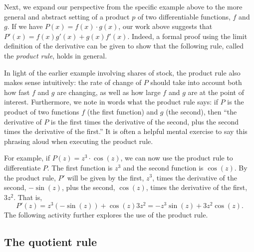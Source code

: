 Next, we expand our perspective from the specific example above to the more general and abstract setting of a product $p$ of two differentiable functions, $f$ and $g$.  If we have $P(x) = f(x) \cdot g(x)$, our work above suggests that $P'(x) = f(x) g'(x) + g(x) f'(x).$ Indeed, a formal proof using the limit definition of the derivative can be given to show that the following rule, called the \emph{product rule}, holds in general.

\vspace*{5pt}
\nin {}
\vspace*{1pt}

In light of the earlier example involving shares of stock, the product rule also makes sense intuitively:  the rate of change of $P$ should take into account both how fast $f$ and $g$ are changing, as well as how large $f$ and $g$ are at the point of interest.  Furthermore, we note in words what the product rule says:  if $P$ is the product of two functions $f$ (the first function) and $g$ (the second), then ``the derivative of $P$ is the first times the derivative of the second, plus the second times the derivative of the first.''  It is often a helpful mental exercise to say this phrasing aloud when executing the product rule.

For example, if $P(z) = z^3 \cdot \cos(z)$, we can now use the product rule to differentiate $P$.  The first function is $z^3$ and the second function is $\cos(z)$.  By the product rule, $P'$ will be given by the first, $z^3$, times the derivative of the second, $-\sin(z)$, plus the second, $\cos(z)$, times the derivative of the first,  $3z^2$.  That is,
$$P'(z) = z^3(-\sin(z)) + \cos(z) 3z^2 = -z^3 \sin(z) + 3z^2 \cos(z).$$
The following activity further explores the use of the product rule.


\subsection*{The quotient rule}


